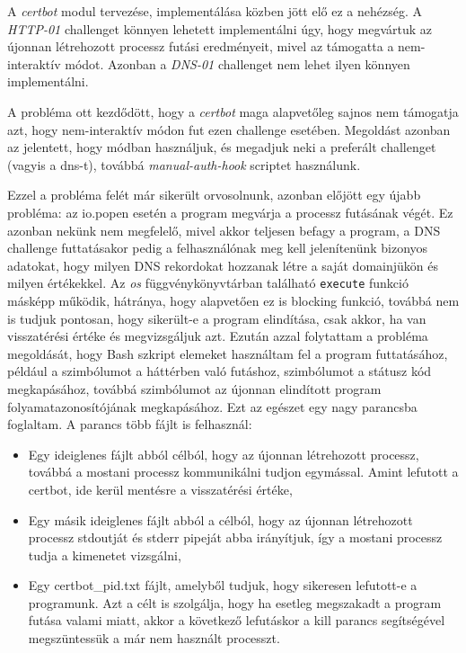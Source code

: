 A \textit{certbot} modul tervezése, implementálása közben jött elő ez a nehézség. A \textit{HTTP-01} challenget könnyen lehetett implementálni úgy, hogy megvártuk az újonnan létrehozott processz futási eredményeit, mivel az támogatta a nem-interaktív módot. Azonban a \textit{DNS-01} challenget nem lehet ilyen könnyen implementálni.

A probléma ott kezdődött, hogy a \textit{certbot} maga alapvetőleg sajnos nem támogatja azt, hogy nem-interaktív módon fut ezen challenge esetében. Megoldást azonban az jelentett, hogy \textit{} módban használjuk, és megadjuk neki a preferált challenget (vagyis a dns-t), továbbá \textit{manual-auth-hook} scriptet használunk. 

Ezzel a probléma felét már sikerült orvosolnunk, azonban előjött egy újabb probléma: az io.popen esetén a program megvárja a processz futásának végét. Ez azonban nekünk nem megfelelő, mivel akkor teljesen befagy a program, a DNS challenge futtatásakor pedig a felhasználónak meg kell jelenítenünk bizonyos adatokat, hogy milyen DNS rekordokat hozzanak létre a saját domainjükön és milyen értékekkel. Az \textit{os} függvénykönyvtárban található \texttt{execute} funkció másképp működik, hátránya, hogy alapvetően ez is blocking funkció, továbbá nem is tudjuk pontosan, hogy sikerült-e a program elindítása, csak akkor, ha van visszatérési értéke és megvizsgáljuk azt.
Ezután azzal folytattam a probléma megoldását, hogy Bash szkript elemeket használtam fel a program futtatásához, például a \texttt{\detokenize{&}} szimbólumot a háttérben való futáshoz, \textit{} szimbólumot a státusz kód megkapásához, továbbá \textit{\detokenize{$!}} szimbólumot az újonnan elindított program folyamatazonosítójának megkapásához. Ezt az egészet egy nagy parancsba foglaltam. A parancs több fájlt is felhasznál:
\begin{itemize}
    \item Egy ideiglenes fájlt abból célból, hogy az újonnan létrehozott processz, továbbá a mostani processz kommunikálni tudjon egymással. Amint lefutott a certbot, ide kerül mentésre a visszatérési értéke,
    \item Egy másik ideiglenes fájlt abból a célból, hogy az újonnan létrehozott processz stdoutját és stderr pipeját abba irányítjuk, így a mostani processz tudja a kimenetet vizsgálni,
    \item Egy certbot\_pid.txt fájlt, amelyből tudjuk, hogy sikeresen lefutott-e a programunk. Azt a célt is szolgálja, hogy ha esetleg megszakadt a program futása valami miatt, akkor a következő lefutáskor a kill parancs segítségével megszüntessük a már nem használt processzt.
\end{itemize}

